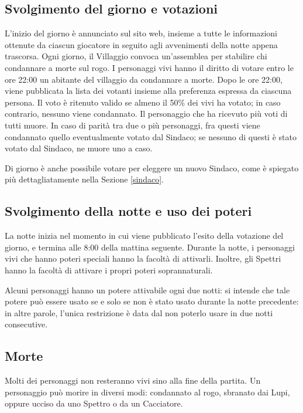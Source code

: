 \documentclass[a4paper,10pt]{article}
\begin{document}
\subsection{Svolgimento del giorno e votazioni}

L'inizio del giorno è annunciato sul sito web, insieme a tutte le informazioni
ottenute da ciascun giocatore in seguito agli avvenimenti della notte appena
trascorsa.
Ogni giorno, il Villaggio convoca un'assemblea per stabilire chi condannare a
morte sul rogo.
I personaggi vivi hanno il diritto di votare entro le ore 22:00 un abitante del
villaggio da condannare a morte. Dopo le ore 22:00, viene pubblicata la lista dei
votanti insieme alla preferenza espressa da ciascuna persona.
Il voto è ritenuto valido se almeno il 50\% dei vivi ha votato; in caso
contrario, nessuno viene condannato. Il personaggio che ha ricevuto più voti di
tutti muore.
In caso di parità tra due o più personaggi, fra questi viene condannato quello
eventualmente votato dal Sindaco; se nessuno di questi è stato votato dal
Sindaco, ne muore uno a caso.

Di giorno è anche possibile votare per eleggere un nuovo Sindaco, come è
spiegato più dettagliatamente nella Sezione \ref{sindaco}.


\subsection{Svolgimento della notte e uso dei poteri}

La notte inizia nel momento in cui viene pubblicato l'esito della votazione del
giorno, e termina alle 8:00 della mattina seguente.
Durante la notte, i personaggi vivi che hanno poteri speciali hanno la facoltà
di attivarli. Inoltre, gli Spettri hanno la facoltà di attivare i propri poteri
soprannaturali.

Alcuni personaggi hanno un potere attivabile ogni due notti: si intende che tale
potere può essere usato se e solo se non è stato usato durante la notte
precedente: in altre parole, l'unica restrizione è data dal non poterlo usare in
due notti consecutive.

\subsection{Morte}

Molti dei personaggi non resteranno vivi sino alla fine della partita. Un
personaggio può morire in diversi modi: condannato al rogo, sbranato dai Lupi,
oppure ucciso da uno Spettro o da un Cacciatore.
\end{document}
